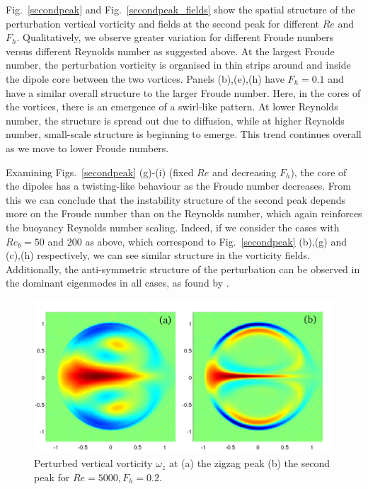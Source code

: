 Fig.~\ref{secondpeak} and Fig.~\ref{secondpeak_fields} show the spatial structure of the perturbation vertical vorticity and fields at the second peak for different $Re$ and $F_{h}$. Qualitatively, we observe greater variation for different Froude numbers versus different Reynolds number as suggested above.  At the largest Froude number, the perturbation vorticity is organised in thin strips around and inside the dipole core between the two vortices. Panels (b),(e),(h) have $F_{h}=0.1$ and have a similar overall structure to the larger Froude number. Here, in the cores of the vortices, there is an emergence of a swirl-like pattern. At lower Reynolds number, the structure is spread out due to diffusion, while at higher Reynolds number, small-scale structure is beginning to emerge. This trend continues overall as we move to lower Froude numbers. 

Examining Figs.~\ref{secondpeak} (g)-(i) (fixed $Re$ and decreasing $F_{h}$), the core of the dipoles has a twisting-like behaviour as the Froude number decreases. From this we can conclude that the instability structure of the second peak depends more on the Froude number than on the Reynolds number, which again reinforces the buoyancy Reynolds number scaling.  Indeed, if we consider the cases with $Re_{b}=50$ and $200$ as above, which correspond to Fig.~\ref{secondpeak} (b),(g) and (c),(h) respectively, we can see similar structure in the vorticity fields. Additionally, the anti-symmetric structure of the perturbation can be observed in the dominant eigenmodes in all cases, as found by \cite{bc1999,bc2000c}.

\begin{figure}
\begin{center}
\includegraphics[scale=0.5]{second_peak_vs_zigzag}
\caption{Perturbed vertical vorticity $\omega_{z}$ at (a) the zigzag peak (b) the second peak for $Re=5000, F_{h}=0.2$.}
\label{zigzagcomparison}
\end{center}
\end{figure}

